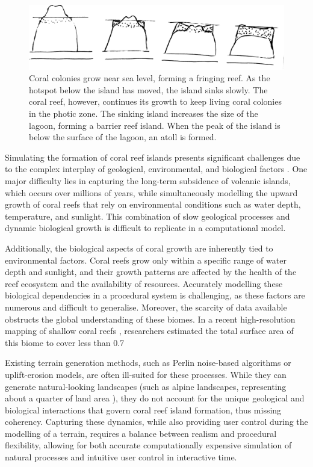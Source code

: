 \begin{figure}[H]
\centering
\includegraphics[width = \linewidth]{other_images/Drawings/Darwin_corals.jpg}
\caption{Coral colonies grow near sea level, forming a fringing reef. As the hotspot below the island has moved, the island sinks slowly. The coral reef, however, continues its growth to keep living coral colonies in the photic zone. The sinking island increases the size of the lagoon, forming a barrier reef island. When the peak of the island is below the surface of the lagoon, an atoll is formed.}
\label{fig:coral-island-reef-growth}
\end{figure}

Simulating the formation of coral reef islands presents significant challenges due to the complex interplay of geological, environmental, and biological factors \cite{Hopley2014}. One major difficulty lies in capturing the long-term subsidence of volcanic islands, which occurs over millions of years, while simultaneously modelling the upward growth of coral reefs that rely on environmental conditions such as water depth, temperature, and sunlight. This combination of slow geological processes and dynamic biological growth is difficult to replicate in a computational model.

Additionally, the biological aspects of coral growth are inherently tied to environmental factors. Coral reefs grow only within a specific range of water depth and sunlight, and their growth patterns are affected by the health of the reef ecosystem and the availability of resources. Accurately modelling these biological dependencies in a procedural system is challenging, as these factors are numerous and difficult to generalise. Moreover, the scarcity of data available obstructs the global understanding of these biomes. In a recent high-resolution mapping of shallow coral reefs \cite{Lyons2024}, researchers estimated the total surface area of this biome to cover less than 0.7%

Existing terrain generation methods, such as Perlin noise-based algorithms or uplift-erosion models, are often ill-suited for these processes. While they can generate natural-looking landscapes (such as alpine landscapes, representing about a quarter of land area \cite{Korner2014}), they do not account for the unique geological and biological interactions that govern coral reef island formation, thus missing coherency. Capturing these dynamics, while also providing user control during the modelling of a terrain, requires a balance between realism and procedural flexibility, allowing for both accurate computationally expensive simulation of natural processes and intuitive user control in interactive time.


